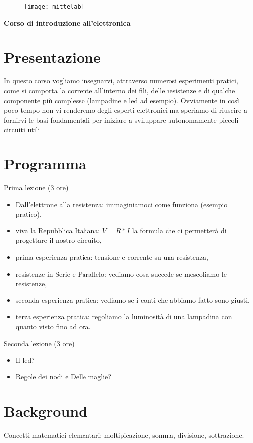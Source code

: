 \documentclass[a4paper,11pt]{article}
\begin{document}
	\pagestyle{empty}
	\begin{flushright}
		\begin{figure}[!h]
			\texttt{[image: mittelab]}
		\end{figure}
	\end{flushright}
	\begin{center}
		\textbf{\Huge Corso di introduzione all'elettronica}\\	
	\end{center}

	\section{Presentazione} %
	\label{sec:presentazione}
		In questo corso vogliamo insegnarvi, attraverso numerosi esperimenti pratici, come si comporta la corrente all'interno dei fili, delle resistenze e di qualche componente più complesso (lampadine e led ad esempio). Ovviamente in così poco tempo non vi renderemo degli esperti elettronici ma speriamo di riuscire a fornirvi le basi fondamentali per iniziare a sviluppare autonomamente piccoli circuiti utili 

	\section{Programma} %
	\label{sec:programma}
		\large Prima lezione (3 ore)
		\begin{itemize}
			\item Dall'elettrone alla resistenza: immaginiamoci come funziona (esempio pratico),
			\item viva la Repubblica Italiana: $V=R*I$ la formula che ci permetterà di progettare il nostro circuito,
			\item prima esperienza pratica: tensione e corrente su una resistenza,
			\item resistenze in Serie e Parallelo: vediamo cosa succede se mescoliamo le resistenze,
			\item seconda esperienza pratica: vediamo se i conti che abbiamo fatto sono giusti,
			\item terza esperienza pratica: regoliamo la luminosità di una lampadina con quanto visto fino ad ora.
		\end{itemize}
		\large Seconda lezione (3 ore)
		\begin{itemize}
			\item Il led?
			\item Regole dei nodi e Delle maglie?
		\end{itemize}
	
	\section{Background} %
	\label{sec:background}
		Concetti matematici elementari: moltipicazione, somma, divisione, sottrazione.
\end{document}
